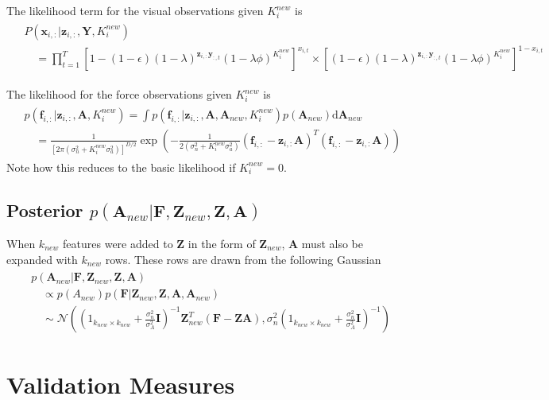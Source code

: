 \documentclass[]{article}
\begin{document}
The likelihood term for the visual observations given $K^{new}_i$ is
	\begin{align}
		\begin{split}
			&P(\mathbf{x}_{i,:}| \mathbf{z}_{i,:}, \mathbf{Y}, K^{new}_i) \\
			&\quad=  \prod_{t=1}^{T} \left[1 - (1-\epsilon)(1-\lambda)^{\mathbf{z}_{i,:}\mathbf{y}_{:,t}}(1-\lambda\phi)^{K^{new}_i}\right]^{x_{i,t}} \times \left[ (1-\epsilon)(1-\lambda)^{\mathbf{z}_{i,:}\mathbf{y}_{:,t}}(1-\lambda\phi)^{K^{new}_i}\right]^{1 - x_{i,t}} 
		\end{split}
	\end{align}
	
The likelihood for the force observations given $K^{new}_i$ is
 	\begin{align}
 		\begin{split}
 			&p(\mathbf{f}_{i,:}|\mathbf{z}_{i,:}, \mathbf{A}, K^{new}_i) = \int p(\mathbf{f}_{i,:}|\mathbf{z}_{i,:}, \mathbf{A}, \mathbf{A}_{new}, K^{new}_i)p(\mathbf{A}_{new}) \text{d} \mathbf{A}_{new} \\
 			&\quad= \frac{1}{[2 \pi (\sigma^2_n + K^{new}_i\sigma^2_a)]^{D/2}}	\exp \left(-\frac{1}{2(\sigma^2_n + K^{new}_i\sigma^2_a)} (\mathbf{f}_{i,:} - \mathbf{z}_{i,:} \mathbf{A})^T (\mathbf{f}_{i,:} - \mathbf{z}_{i,:} \mathbf{A}) \right)
 		\end{split}
 	\end{align}
Note how this reduces to the basic likelihood if  $K^{new}_i = 0$.
	
\subsection{Posterior $p(\mathbf{A}_{new}| \mathbf{F}, \mathbf{Z}_{new}, \mathbf{Z}, \mathbf{A})$}
	When $k_{new}$ features were added to $\mathbf{Z}$ in the form of $\mathbf{Z}_{new}$, $\mathbf{A}$ must also be expanded with $k_{new}$ rows. These rows are drawn from the following Gaussian
	\begin{align}
		\begin{split}\label{eq:posterior_Anew}
			&p(\mathbf{A}_{new}| \mathbf{F}, \mathbf{Z}_{new}, \mathbf{Z}, \mathbf{A}) \\
			&\quad \propto p(A_{new}) p(\mathbf{F} | \mathbf{Z}_{new}, \mathbf{Z}, \mathbf{A}, \mathbf{A}_{new}) \\
			&\quad \sim \mathcal{N}\left( \left(1_{k_{new}\times k_{new}}  + \frac{\sigma^2_n}{\sigma^2_A}\mathbf{I}\right)^{-1} \mathbf{Z}^T_{new} (\mathbf{F} - \mathbf{Z} \mathbf{A}), \sigma^2_n \left(1_{k_{new}\times k_{new}}  + \frac{\sigma^2_n}{\sigma^2_A}\mathbf{I}\right)^{-1}  \right)
		\end{split}
	\end{align}

\section{Validation Measures}
\end{document}
